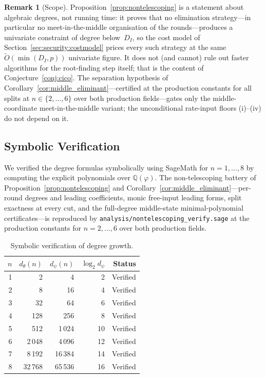 \documentclass[11pt,a4paper]{article}
\theoremstyle{definition}
\newtheorem{remark}[theorem]{Remark}
\begin{document}
\begin{remark}[Scope]\label{rem:nontelescoping_scope}
Proposition~\ref{prop:nontelescoping} is a statement about algebraic
degrees, not running time: it proves that no elimination strategy---in
particular no meet-in-the-middle organisation of the rounds---produces
a univariate constraint of degree below~$D_I$, so the cost model of
Section~\ref{sec:security:costmodel} prices every such strategy at the
same $\widetilde{O}(\min(D_I, p))$ univariate figure. It does not (and
cannot) rule out faster algorithms for the root-finding step itself;
that is the content of Conjecture~\ref{conj:cico}. The separation
hypothesis of Corollary~\ref{cor:middle_eliminant}---certified at the
production constants for all splits at $n \in \{2, \ldots, 6\}$ over
both production fields---gates only the middle-coordinate
meet-in-the-middle variant; the unconditional rate-input floors
(i)--(iv) do not depend on it.
\end{remark}


\subsection{Symbolic Verification}\label{sec:degree:verification}

We verified the degree formulas symbolically using SageMath for
$n = 1, \ldots, 8$ by computing the explicit polynomials over
$\mathbb{Q}(\varphi)$. The non-telescoping battery of
Proposition~\ref{prop:nontelescoping} and
Corollary~\ref{cor:middle_eliminant}---per-round degrees and leading
coefficients, monic free-input leading forms, split exactness at every
cut, and the full-degree middle-state minimal-polynomial
certificates---is reproduced by \texttt{analysis/nontelescoping\_verify.sage}
at the production constants for $n = 2, \ldots, 6$ over both production
fields.

\begin{table}[h]
\centering
\caption{Symbolic verification of degree growth.}
\label{tab:degree}
\begin{tabular}{@{}rrrrr@{}}
\toprule
$n$ & $d_\theta(n)$ & $d_\psi(n)$ & $\log_2 d_\psi$ & Status \\
\midrule
1 & 2 & 4 & 2 & Verified \\
2 & 8 & 16 & 4 & Verified \\
3 & 32 & 64 & 6 & Verified \\
4 & 128 & 256 & 8 & Verified \\
5 & 512 & 1\,024 & 10 & Verified \\
6 & 2\,048 & 4\,096 & 12 & Verified \\
7 & 8\,192 & 16\,384 & 14 & Verified \\
8 & 32\,768 & 65\,536 & 16 & Verified \\
\bottomrule
\end{tabular}
\end{table}
\end{document}
